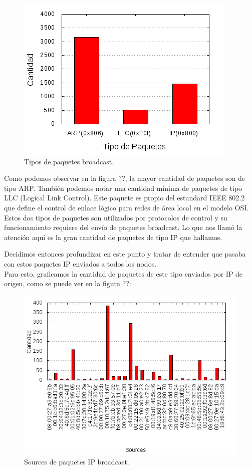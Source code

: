 \begin{figure}[ht]
    \centering
    \includegraphics[scale=0.7]{figuras/experimento2-tipos-paquetes.png}
    \caption{Tipos de paquetes broadcast.}\label{Tipos de paquetes}
\end{figure}

Como podemos observar en la figura ??, la mayor cantidad de paquetes son de tipo ARP. Tambi\'en podemos notar una cantidad m\'inima de paquetes de tipo LLC (Logical Link Control). Este paquete es propio del estandard IEEE 802.2 que define el control de enlace l\'ogico para redes de \'area local en el modelo OSI. Estos dos tipos de paquetes son utilizados por protocolos de control y su funcionamiento requiere del env\'io de paquetes broadcast. Lo que nos llam\'o la atenci\'on aqu\'i es la gran cantidad de paquetes de tipo IP que hallamos.

Decidimos entonces profundizar en este punto y tratar de entender que pasaba con estos paquetes IP env\'iados a todos los nodos. \\
Para esto, graficamos la cantidad de paquetes de este tipo enviados por IP de origen, como se puede ver en la figura ??:

\begin{figure}[ht]
    \centering
    \includegraphics[scale=0.7]{figuras/experimento2-ips-origen.png}
    \caption{Sources de paquetes IP broadcast.}\label{Sources de paquetes IP broadcast}
\end{figure}

